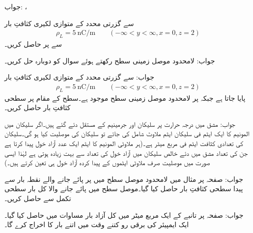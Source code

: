 جواب: ، 


 سے گزرتی  محدد کے متوازی لکیری کثافتِ بار
\begin{align*}
\rho_L=\SI{5}{\nano \coulomb \per \meter}  \quad \quad (-\infty < y < \infty, x=0,z=2)
\end{align*} 
سے  پر  حاصل کریں۔

جواب:
لامحدود موصل زمینی سطح   رکھتے ہوئے  سوال  کو دوبارہ حل کریں۔

جواب:
 سے گزرتی  محدد کے متوازی لکیری کثافتِ بار
\begin{align*}
\rho_L=\SI{5}{\nano \coulomb \per \meter}  \quad \quad (-\infty < y < \infty, x=0,z=2)
\end{align*} 
پایا جاتا ہے جبکہ  پر لامحدود موصل زمینی سطح موجود ہے۔سطح کے  مقام پر سطحی کثافتِ بار حاصل کریں۔

جواب: 
مشق  میں  درجہ حرارت پر  سلیکان اور جرمینیم کے مستقل دئے گئے ہیں۔اگر سلیکان میں المونیم کا ایک ایٹم فی   سلیکان ایٹم  ملاوٹ شامل کی جائے تو سلیکان کی موصلیت کیا ہو گی۔سلیکان کی تعدادی کثافت  ایٹم فی مربع میٹر ہے۔(ہر ملاوٹی المونیم کا  ایٹم ایک عدد آزاد خول پیدا کرتا ہے جن  کی تعداد مشق میں دئے خالص سلیکان میں آزاد خول کی تعداد سے بہت زیادہ ہوتی ہے لہٰذا ایسی صورت میں موصلیت صرف ملاوٹی ایٹموں کے پیدا کردہ آزاد خول ہی تعین کرتے ہیں۔) 

جواب: 
صفحہ  پر مثال  میں لامحدود موصل سطح  میں  پر پائے جانے والے نقطہ بار  سے پیدا سطحی کثافتِ بار  حاصل کیا گیا۔موصل سطح میں پائے جانے والا کل بار سطحی تکمل سے حاصل کریں۔

جواب:  
صفحہ  پر تانبے کے ایک مربع میٹر میں کل آزاد بار مساوات  میں حاصل کیا گیا۔ایک ایمپیئر کی برقی رو کتنے وقت میں اتنے بار کا اخراج کرے گا۔

